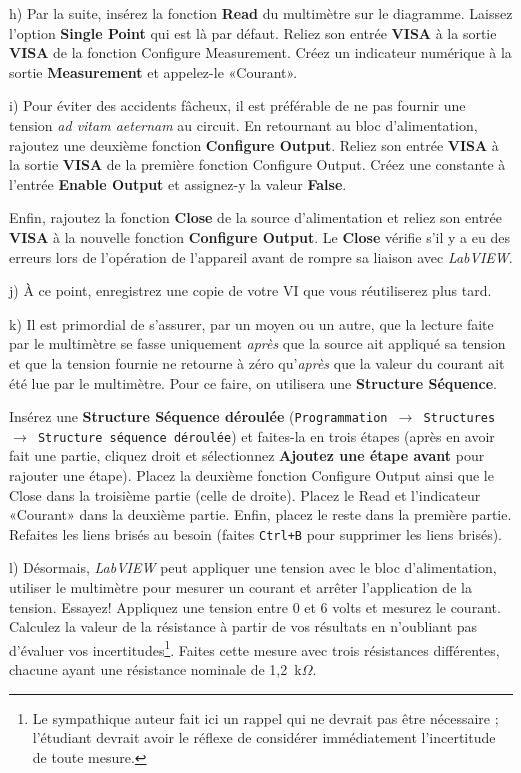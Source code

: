 \documentclass[canadien,12pt,oneside,letterpaper]{article}
\begin{document}
h) Par la suite, insérez la fonction \textbf{Read} du multimètre sur le diagramme. Laissez l'option \textbf{Single Point} qui est là par défaut. Reliez son entrée \textbf{VISA} à la sortie \textbf{VISA} de la fonction Configure Measurement. Créez un indicateur numérique à la sortie \textbf{Measurement} et appelez-le «Courant».

i) Pour éviter des accidents fâcheux, il est préférable de ne pas fournir une tension \textit{ad vitam aeternam} au circuit. En retournant au bloc d'alimentation, rajoutez une deuxième fonction \textbf{Configure Output}. Reliez son entrée \textbf{VISA} à la sortie \textbf{VISA} de la première fonction Configure Output. Créez une constante à l'entrée \textbf{Enable Output} et assignez-y la valeur \textbf{False}.

Enfin, rajoutez la fonction \textbf{Close} de la source d'alimentation et reliez son entrée \textbf{VISA} à la nouvelle fonction \textbf{Configure Output}. Le \textbf{Close} vérifie s'il y a eu des erreurs lors de l'opération de l'appareil avant de rompre sa liaison avec \textit{LabVIEW}.

j) À ce point, enregistrez une copie de votre VI que vous réutiliserez plus tard.

k) Il est primordial de s'assurer, par un moyen ou un autre, que la lecture faite par le multimètre se fasse uniquement \textit{après} que la source ait appliqué sa tension et que la tension fournie ne retourne à zéro qu'\textit{après} que la valeur du courant ait été lue par le multimètre. Pour ce faire, on utilisera une \textbf{Structure Séquence}.

Insérez une \textbf{Structure Séquence déroulée} (\texttt{Programmation $\rightarrow$ Structures $\rightarrow$ Structure séquence déroulée}) et faites-la en trois étapes (après en avoir fait une partie, cliquez droit et sélectionnez \textbf{Ajoutez une étape avant} pour rajouter une étape).  Placez la deuxième fonction Configure Output ainsi que le Close dans la troisième partie (celle de droite). Placez le Read et l'indicateur «Courant» dans la deuxième partie. Enfin, placez le reste dans la première partie. Refaites les liens brisés au besoin (faites \texttt{Ctrl+B} pour supprimer les liens brisés).

l) Désormais, \textit{LabVIEW} peut appliquer une tension avec le bloc d'alimentation, utiliser le multimètre pour mesurer un courant et arrêter l'application de la tension. Essayez! Appliquez une tension entre 0 et 6 volts et mesurez le courant. Calculez la valeur de la résistance à partir de vos résultats en n'oubliant pas d'évaluer vos incertitudes\footnote{Le sympathique auteur fait ici un rappel qui ne devrait pas être nécessaire ; l'étudiant devrait avoir le réflexe de considérer immédiatement l'incertitude de toute mesure.}. Faites cette mesure avec trois résistances différentes, chacune ayant une résistance nominale de 1,2~k$\Omega$.
\end{document}
